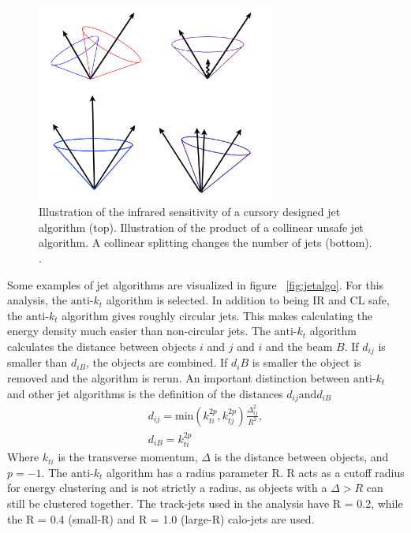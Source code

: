 \begin{figure}[h]
\begin{center}
\includegraphics*[width=0.70\textwidth] {figures/IR_CL_safe}
\caption[Illustration of Infrared and collinear safety]{Illustration of the infrared sensitivity of a cursory designed jet algorithm (top). Illustration of the product of a collinear unsafe jet algorithm. A collinear splitting changes the number of jets (bottom). \cite{Isildak:2013kfa}.}
\label{fig:IR_CL}
\end{center}
\end{figure}

\indent Some examples of jet algorithms are visualized in figure ~\ref{fig:jetalgo}. For this analysis, the ${\textrm{anti-}k_{t}}$ algorithm is selected. In addition to being IR and CL safe, the ${\textrm{anti-}k_{t}}$ algorithm gives roughly circular jets. This makes calculating the energy density much easier than non-circular jets. The ${\textrm{anti-}k_{t}}$ algorithm calculates the distance between objects $i$ and $j$ and $i$ and the beam $B$. If ${d_{ij}}$ is smaller than ${d_{iB}}$, the objects are combined. If ${d_i{B}}$ is smaller the object is removed and the algorithm is rerun. An important distinction between ${\textrm{anti-}k_{t}}$ and other jet algorithms is the definition of the distances ${d_{ij}\mathrm{ and} d_{iB}}$
\begin{equation}
\begin{split}
d_{ij} = \mathrm{min}(k^{2p}_{ti},k^{2p}_{tj})\frac{\Delta^{2}_{ij}}{R^{2}},\\
d_{iB} = k^{2p}_{ti}
\end{split}
\end{equation}
Where ${k_{ti}}$ is the transverse momentum, ${\Delta}$ is the distance between objects, and ${p=-1}$. The ${\textrm{anti-}k_{t}}$ algorithm has a radius parameter R. R acts as a cutoff radius for energy clustering and is not strictly a radius, as objects with a ${\Delta > R}$ can still be clustered together. The track-jets used in the analysis have R = 0.2, while the R = 0.4 (small-R) and R = 1.0 (large-R) calo-jets are used. 
